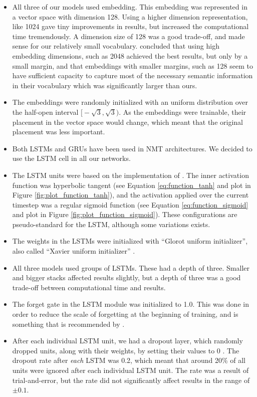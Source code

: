 \begin{itemize}
    \item All three of our models used embedding. This embedding was represented in a vector space with dimension 128. Using a higher dimension representation, like 1024 gave tiny improvements in results, but increased the computational time tremendously. A dimension size of 128 was a good trade-off, and made sense for our relatively small vocabulary. \cite{britz2017massive} concluded that using high embedding dimensions, such as 2048 achieved the best results, but only by a small margin, and that embeddings with smaller margins, such as 128 seem to have sufficient capacity to capture most of the necessary semantic information in their vocabulary which was significantly larger than ours.
    \item The embeddings were randomly initialized with an uniform distribution over the half-open interval \(\big[-\sqrt{3}, \sqrt{3}\big)\). As the embeddings were trainable, their placement in the vector space would change, which meant that the original placement was less important.
    \item Both LSTMs and GRUs have been used in NMT architectures. We decided to use the LSTM cell in all our networks. 
    \item The LSTM units were based on the implementation of \cite{hochreiter1997long}. The inner activation function was hyperbolic tangent (see Equation \ref{eq:function_tanh} and plot in Figure \ref{fig:plot_function_tanh}), and the activation applied over the current timestep was a regular sigmoid function (see Equation \ref{eq:function_sigmoid} and plot in Figure \ref{fig:plot_function_sigmoid}). These configurations are pseudo-standard for the LSTM, although some variations exists.
    \item The weights in the LSTMs were initialized with ``Glorot uniform initializer'', also called ``Xavier uniform initializer'' \citep{glorot2010understanding}.
    \item All three models used groups of LSTMs. These had a depth of three. Smaller and bigger stacks affected results slightly, but a depth of three was a good trade-off between computational time and results.
    \item The forget gate in the LSTM module was initialized to 1.0. This was done in order to reduce the scale of forgetting at the beginning of training, and is something that is recommended by \cite{zaremba2015empirical}.
    \item After each individual LSTM unit, we had a dropout layer, which randomly dropped units, along with their weights, by setting their values to 0 \citep{srivastava2014dropout}. The dropout rate after \emph{each} LSTM was 0.2, which meant that around 20\% of all units were ignored after each individual LSTM unit. The rate was a result of trial-and-error, but the rate did not significantly affect results in the range of \(\pm 0.1\).
\end{itemize}

